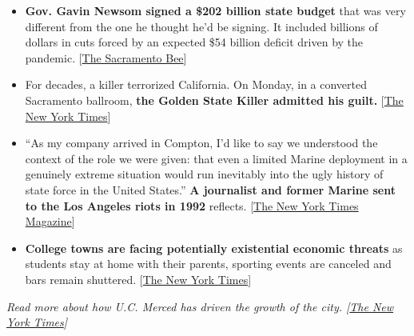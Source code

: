 \begin{itemize}
\item
  \textbf{Gov. Gavin Newsom signed a \$202 billion state budget} that
  was very different from the one he thought he'd be signing. It
  included billions of dollars in cuts forced by an expected \$54
  billion deficit driven by the pandemic.
  {[}\href{https://www.sacbee.com/news/politics-government/capitol-alert/article243876497.html}{The
  Sacramento Bee}{]}
\item
  For decades, a killer terrorized California. On Monday, in a converted
  Sacramento ballroom, \textbf{the Golden State Killer admitted his
  guilt.}
  {[}\href{https://www.nytimes.com/2020/06/29/us/golden-state-killer-joseph-deangelo.html?referringSource=articleShare}{The
  New York Times}{]}
\item
  ``As my company arrived in Compton, I'd like to say we understood the
  context of the role we were given: that even a limited Marine
  deployment in a genuinely extreme situation would run inevitably into
  the ugly history of state force in the United States.'' \textbf{A
  journalist and former Marine sent to the Los Angeles riots in 1992}
  reflects.
  {[}\href{https://www.nytimes.com/2020/06/23/magazine/la-riots-1992.html}{The
  New York Times Magazine}{]}
\item
  \textbf{College towns are facing potentially existential economic
  threats} as students stay at home with their parents, sporting events
  are canceled and bars remain shuttered.
  {[}\href{https://www.nytimes.com/2020/06/28/us/coronavirus-college-towns.html?smid=tw-share}{The
  New York Times}{]}
\end{itemize}

\emph{Read more about how U.C. Merced has driven the growth of the city.
{[}}\href{https://www.nytimes.com/2019/08/05/us/uc-merced-chancellor-leland.html}{\emph{The
New York Times}}\emph{{]}}

